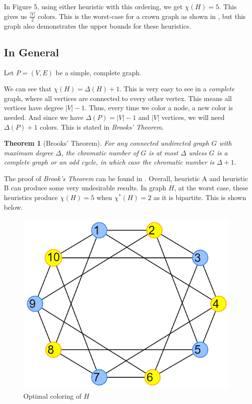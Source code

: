 \documentclass{article}
\newtheorem*{theorem}{Theorem}
\begin{document}
In Figure 5, using either heuristic with this ordering, we get \(\chi(H) = 5\). This gives us \(\frac{|V|}{2}\) colors. This is the worst-case for a crown graph as shown in \cite{johnson}, but this graph also demonstrates the upper bounds for these heuristics. \newline

\subsection*{In General}

Let \(P = (V, E)\) be a simple, complete graph. \newline

We can see that \(\chi(H) = \Delta(H) + 1\). This is very easy to see in a \emph{complete} graph, where all vertices are connected to every other vertex. This means all vertices have degree \(|V| - 1\). Thus, every time we color a node, a new color is needed. And since we have \(\Delta(P) = |V| - 1\) and \(|V|\) vertices, we will need \(\Delta(P) + 1\) colors. This is stated in \emph{Brooks' Theorem}.

\begin{theorem}[Brooks' Theorem]
For any connected undirected graph \(G\) with maximum degree \(\Delta\), the chromatic number of \(G\) is at most \(\Delta\) unless \(G\) is a complete graph or an odd cycle, in which case the chromatic number is \(\Delta + 1\).
\end{theorem}

The proof of \emph{Brook's Theorem} can be found in \cite{lovasz}. Overall, heuristic A and heuristic B can produce some very undesirable results. In graph \(H\), at the worst case, these heuristics produce \(\chi(H) = 5\) when \(\chi^{*}(H) = 2\) as it is bipartite. This is shown below.

\begin{figure}[H]
\centering
\includegraphics[scale=0.38]{images/graph-6.png}
\caption{Optimal coloring of \(H\)}
\end{figure}
\end{document}
